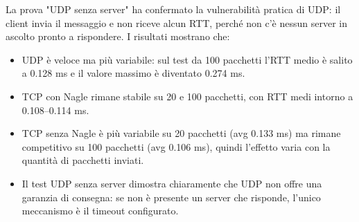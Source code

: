 \documentclass[12pt,a4paper,oneside]{article}
\begin{document}
La prova "UDP senza server" ha confermato la vulnerabilità pratica di UDP: il client invia il messaggio e non riceve alcun RTT, perché non c'è nessun server in ascolto pronto a rispondere.
 \newpage
I risultati mostrano che:
\begin{itemize}
    \item UDP è veloce ma più variabile: sul test da 100 pacchetti l'RTT medio è salito a 0.128 ms e il valore massimo è diventato 0.274 ms.
    \item TCP con Nagle rimane stabile su 20 e 100 pacchetti, con RTT medi intorno a 0.108--0.114 ms.
    \item TCP senza Nagle è più variabile su 20 pacchetti (avg 0.133 ms) ma rimane competitivo su 100 pacchetti (avg 0.106 ms), quindi l'effetto varia con la quantità di pacchetti inviati.
    \item Il test UDP senza server dimostra chiaramente che UDP non offre una garanzia di consegna: se non è presente un server che risponde, l'unico meccanismo è il timeout configurato.
\end{itemize}
\end{document}

